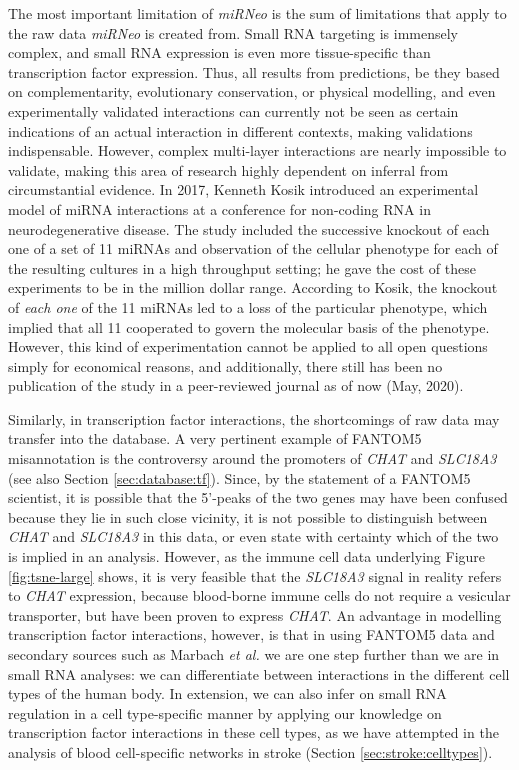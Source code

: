The most important limitation of \emph{miRNeo} is the sum of limitations that apply to the raw data \emph{miRNeo} is created from. Small RNA targeting is immensely complex, and small RNA expression is even more tissue-specific than transcription factor expression.\cite{Nowakowski2018} Thus, all results from predictions, be they based on complementarity, evolutionary conservation, or physical modelling, and even experimentally validated interactions can currently not be seen as certain indications of an actual interaction in different contexts, making validations indispensable. However, complex multi-layer interactions are nearly impossible to validate, making this area of research highly dependent on inferral from circumstantial evidence. In 2017, Kenneth Kosik introduced an experimental model of miRNA interactions at a conference for non-coding RNA in neurodegenerative disease.\cite{Kosik2017p} The study included the successive knockout of each one of a set of 11 miRNAs and observation of the cellular phenotype for each of the resulting cultures in a high throughput setting; he gave the cost of these experiments to be in the million dollar range. According to Kosik, the knockout of \emph{each one} of the 11 miRNAs led to a loss of the particular phenotype, which implied that all 11 cooperated to govern the molecular basis of the phenotype. However, this kind of experimentation cannot be applied to all open questions simply for economical reasons, and additionally, there still has been no publication of the study in a peer-reviewed journal as of now (May, 2020).\cite{Kosik2020w}

Similarly, in transcription factor interactions, the shortcomings of raw data may transfer into the database. A very pertinent example of FANTOM5 misannotation is the controversy around the promoters of \emph{CHAT} and \emph{SLC18A3} (see also Section \ref{sec:database:tf}). Since, by the statement of a FANTOM5 scientist, it is possible that the 5'-peaks of the two genes may have been confused because they lie in such close vicinity, it is not possible to distinguish between \emph{CHAT} and \emph{SLC18A3} in this data, or even state with certainty which of the two is implied in an analysis. However, as the immune cell data underlying Figure \ref{fig:tsne-large} shows, it is very feasible that the \emph{SLC18A3} signal in reality refers to \emph{CHAT} expression, because blood-borne immune cells do not require a vesicular transporter, but have been proven to express \emph{CHAT}. An advantage in modelling transcription factor interactions, however, is that in using FANTOM5 data and secondary sources such as Marbach \emph{et al.}\cite{Marbach2016} we are one step further than we are in small RNA analyses: we can differentiate between interactions in the different cell types of the human body. In extension, we can also infer on small RNA regulation in a cell type-specific manner by applying our knowledge on transcription factor interactions in these cell types, as we have attempted in the analysis of blood cell-specific networks in stroke (Section \ref{sec:stroke:celltypes}).

